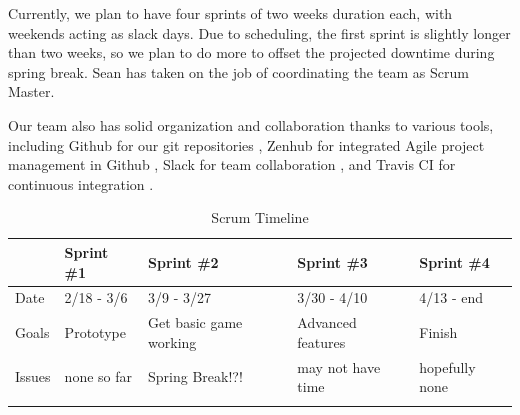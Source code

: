 \documentclass[12pt]{article}
\begin{document}
Currently, we plan to have four sprints of two weeks duration each,
with weekends acting as slack days. Due to scheduling, the first
sprint is slightly longer than two weeks, so we plan to do more to
offset the projected downtime during spring break. Sean has taken on the job of coordinating the team as Scrum Master.

Our team also has solid organization and collaboration thanks to various tools, including Github for our git repositories \cite{github:site}, Zenhub for integrated Agile project management in Github \cite{zenhub:site}, Slack for team collaboration \cite{slack:site}, and Travis CI for continuous integration \cite{travis:site}.


\begin{table}[H]
\centering
\begin{tabular}{|l|l|l|l|l|}
\hline
& Sprint \#1 & Sprint \#2 & Sprint \#3 & Sprint \#4 \\ \hline
Date & 2/18 - 3/6 & 3/9 - 3/27 & 3/30 - 4/10 & 4/13 - end \\ \hline
Goals & Prototype & Get basic game working & Advanced features & Finish \\ \hline
Issues & none so far & Spring Break!?! & may not have time & hopefully none \\ \hline
&  &  &  &  \\ \hline
\end{tabular}
\caption{Scrum Timeline}
\label{timeline}
\end{table}




\end{document}
